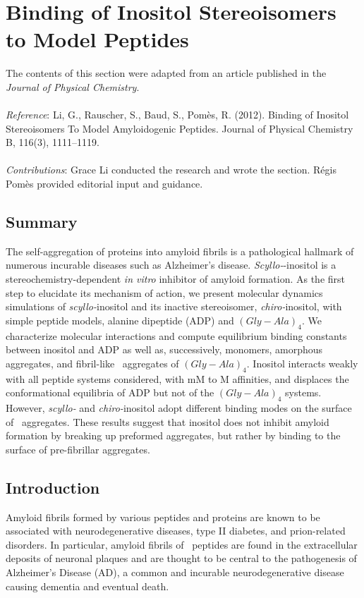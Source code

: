 \chapter{Binding of Inositol Stereoisomers to Model Peptides}

The contents of this section were adapted from an article published in the \emph{Journal of Physical Chemistry}.
\\
\\
\emph{Reference}:
Li, G., Rauscher, S., Baud, S., Pom\`{e}s, R. (2012). Binding of Inositol Stereoisomers To Model Amyloidogenic Peptides. Journal of Physical Chemistry B, 116(3), 1111–1119.
\\
\\
\emph{Contributions}:
Grace Li conducted the research and wrote the section. R\'{e}gis Pom\`{e}s provided editorial input and guidance.

\newpage

\section{Summary}
The self-aggregation of proteins into amyloid fibrils is a pathological hallmark of numerous incurable diseases such as Alzheimer's disease. \textit{Scyllo-}-inositol is a stereochemistry-dependent  \textit{in vitro}  inhibitor of amyloid formation. As the first step to elucidate its mechanism of action, we present molecular dynamics simulations of \textit{scyllo-}inositol and its inactive stereoisomer, \textit{chiro-}inositol, with simple peptide models, alanine dipeptide (ADP) and $(Gly-Ala)_4$. We characterize molecular interactions and compute equilibrium binding constants between inositol and ADP as well as, successively, monomers, amorphous aggregates, and fibril-like \bsheet\ aggregates of $(Gly-Ala)_4$.\cite{Balbach:2000p49}
Inositol interacts weakly with all peptide systems considered, with mM to M affinities, and displaces the conformational equilibria of ADP but not of the $(Gly-Ala)_4$ systems. However, \textit{scyllo-} and \textit{chiro-}inositol adopt different binding modes on the surface of \bsheet\ aggregates. These results suggest that inositol does not inhibit amyloid formation by breaking up preformed aggregates, but rather by binding to the surface of pre-fibrillar aggregates.

\section{Introduction}
Amyloid fibrils formed by various peptides and proteins are known to be associated with neurodegenerative diseases, type II diabetes, and prion-related disorders.\cite{Chiti:2006p20} In particular, amyloid fibrils of \abeta\ peptides are found in the extracellular deposits of neuronal plaques and are thought to be central to the pathogenesis of Alzheimer's Disease (AD),\cite{Chiti:2006p20,Hardy:2002p27} a common and incurable neurodegenerative disease causing dementia and eventual death. 

